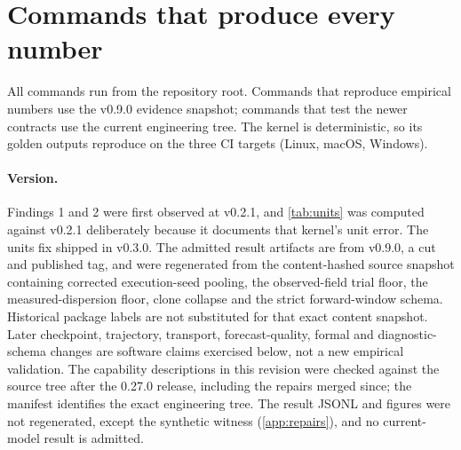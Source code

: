\section{Commands that produce every number}\label{app:commands}

All commands run from the repository root. Commands that reproduce empirical numbers use the v0.9.0 evidence snapshot; commands that test the newer contracts use the current engineering tree. The kernel is deterministic, so its golden outputs reproduce on the three CI targets (Linux, macOS, Windows).

\paragraph{Version.} Findings 1 and 2 were first observed at v0.2.1, and \cref{tab:units} was computed against v0.2.1 deliberately because it documents that kernel's unit error. The units fix shipped in v0.3.0. The admitted result artifacts are from v0.9.0, a cut and published tag, and were regenerated from the content-hashed source snapshot containing corrected execution-seed pooling, the observed-field trial floor, the measured-dispersion floor, clone collapse and the strict forward-window schema. Historical package labels are not substituted for that exact content snapshot. Later checkpoint, trajectory, transport, forecast-quality, formal and diagnostic-schema changes are software claims exercised below, not a new empirical validation. The capability descriptions in this revision were checked against the source tree after the 0.27.0 release, including the repairs merged since; the manifest identifies the exact engineering tree. The result JSONL and figures were not regenerated, except the synthetic witness (\cref{app:repairs}), and no current-model result is admitted.

